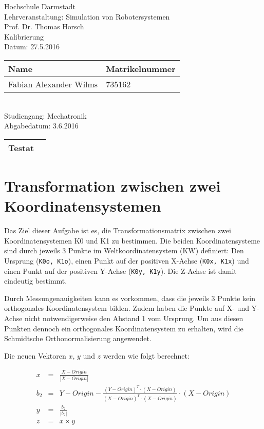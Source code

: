\documentclass[11pt, a4paper]{article}
\date{\today}
\newcommand{\code}{\texttt}
\begin{document}
\begin{center}
{\Huge Hochschule Darmstadt} \\
\vspace{0.5cm}
Lehrveranstaltung: Simulation von Robotersystemen \\
Prof. Dr. Thomas Horsch \\
Kalibrierung\\
Datum: 27.5.2016 \\
\vfill
\renewcommand{\arraystretch}{2}
	\begin{tabular}{| l | l |}
	\hline
	Name & Matrikelnummer \\ \hline
	Fabian Alexander Wilms & 735162 \\ \hline
	\end{tabular} \\
\vspace{0.5cm}
Studiengang: Mechatronik \\
Abgabedatum: 3.6.2016 \\
\vspace{0.5cm}
\begin{tabular}{| l | p{5cm} |}
	\hline
	Testat & \\ \hline
\end{tabular}
\renewcommand{\arraystretch}{1}
\end{center}
\newpage
\tableofcontents
\newpage
\section{Transformation zwischen zwei Koordinatensystemen}
Das Ziel dieser Aufgabe ist es, die Transformationsmatrix zwischen zwei Koordinatensystemen K0 und K1 zu bestimmen. Die beiden Koordinatensysteme sind durch jeweils 3 Punkte im Weltkoordinatensystem (KW) definiert: Den Ursprung (\code{K0o, K1o}), einen Punkt auf der positiven X-Achse (\code{K0x, K1x}) und einen Punkt auf der positiven Y-Achse (\code{K0y, K1y}). Die Z-Achse ist damit eindeutig bestimmt.

Durch Messungenauigkeiten kann es vorkommen, dass die jeweils 3 Punkte kein orthogonales Koordinatensystem bilden. Zudem haben die Punkte auf X- und Y-Achse nicht notwendigerweise den Abstand 1 vom Ursprung. Um aus diesen Punkten dennoch ein orthogonales Koordinatensystem zu erhalten, wird die Schmidtsche Orthonormalisierung angewendet.

Die neuen Vektoren $x$, $y$ und $z$ werden wie folgt berechnet:

\begin{eqnarray*}
x &=& \frac{X-Origin}{|X-Origin|} \\
b_2 &=& Y - Origin - \frac{(Y-Origin)^T \cdot (X-Origin)}{(X-Origin)^T \cdot (X-Origin)} \cdot (X- Origin) \\
y &=& \frac{b_2}{|b_2|} \\
z &=& x \times y
\end{eqnarray*}
\end{document}
